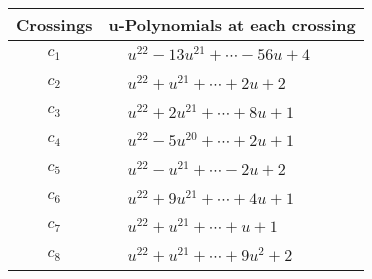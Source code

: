 \documentclass[1p]{elsarticle_modified}
\theoremstyle{definition}
\begin{document}
\begin{tabular}{m{50pt}|m{274pt}}
Crossings & \hspace{64pt}u-Polynomials at each crossing \\
\hline $$\begin{aligned}c_{1}\end{aligned}$$&$\begin{aligned}
&u^{22}-13 u^{21}+\cdots-56 u+4
\end{aligned}$\\
\hline $$\begin{aligned}c_{2}\end{aligned}$$&$\begin{aligned}
&u^{22}+u^{21}+\cdots+2 u+2
\end{aligned}$\\
\hline $$\begin{aligned}c_{3}\end{aligned}$$&$\begin{aligned}
&u^{22}+2 u^{21}+\cdots+8 u+1
\end{aligned}$\\
\hline $$\begin{aligned}c_{4}\end{aligned}$$&$\begin{aligned}
&u^{22}-5 u^{20}+\cdots+2 u+1
\end{aligned}$\\
\hline $$\begin{aligned}c_{5}\end{aligned}$$&$\begin{aligned}
&u^{22}- u^{21}+\cdots-2 u+2
\end{aligned}$\\
\hline $$\begin{aligned}c_{6}\end{aligned}$$&$\begin{aligned}
&u^{22}+9 u^{21}+\cdots+4 u+1
\end{aligned}$\\
\hline $$\begin{aligned}c_{7}\end{aligned}$$&$\begin{aligned}
&u^{22}+u^{21}+\cdots+u+1
\end{aligned}$\\
\hline $$\begin{aligned}c_{8}\end{aligned}$$&$\begin{aligned}
&u^{22}+u^{21}+\cdots+9 u^2+2
\end{aligned}$\\

\end{tabular}
\end{document}
